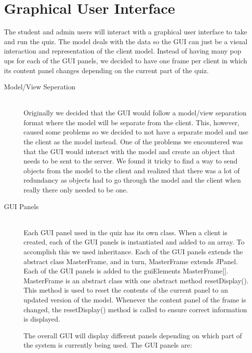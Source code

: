 \section{Graphical User Interface}
\label{sec:graphical user interface}

The student and admin users will interact with a graphical user interface to take and 
run the quiz. The model deals with the data so the GUI can just be a visual interaction 
and representation of the client model. Instead of having many pop ups for each of the 
GUI panels, we decided to have one frame per client in which its content panel changes 
depending on the current part of the quiz.

\begin{description}
	\item[Model/View Seperation] \hfill \\ Originally we decided that the GUI would 
		follow a model/view separation format where the model will be separate 
		from the client. This, however, caused some problems so we decided to 
		not have a separate model and use the client as the model instead. One 
		of the problems we encountered was that the GUI would interact with the 
		model and create an object that needs to be sent to the server. We found 
		it tricky to find a way to send objects from the model to the client and 
		realized that there was a lot of redundancy as objects had to go through 
		the model and the client when really there only needed to be one.
	
	\item[GUI Panels] \hfill \\ Each GUI panel used in the quiz has its own class. 
		When a client is created, each of the GUI panels is instantiated and 
		added to an array. To accomplish this we used inheritance. Each of the 
		GUI panels extends the abstract class MasterFrame, and in turn, 
		MasterFrame extends JPanel. Each of the GUI panels is added to the 
		guiElements MasterFrame[]. MasterFrame is an abstract class with one 
		abstract method resetDisplay(). This method is used to reset the 
		contents of the current panel to an updated version of the model. 
		Whenever the content panel of the frame is changed, the resetDisplay() 
		method is called to ensure correct information is displayed.

		The overall GUI will display different panels depending on which part of 
		the system is currently being used. The GUI panels are: 

	\begin{description}


\end{description}
\end{description}
